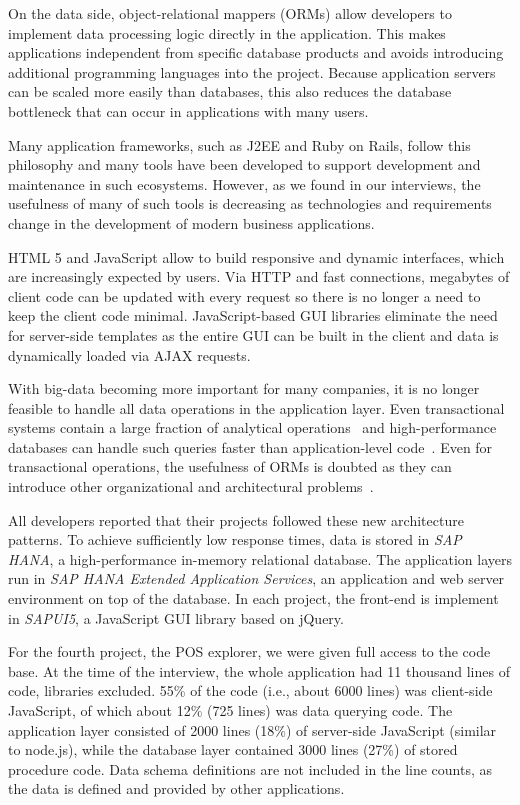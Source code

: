 \documentclass[
      english,
			conference,
      ]{IEEEtran}
\begin{document}
On the data side, object-relational mappers (ORMs) allow developers to implement data processing logic directly in the application.
This makes applications independent from specific database products and avoids introducing additional programming languages into the project.
Because application servers can be scaled more easily than databases, this also reduces the database bottleneck that can occur in applications with many users.

Many application frameworks, such as J2EE and Ruby on Rails, follow this philosophy and many tools have been developed to support development and maintenance in such ecosystems.
However, as we found in our interviews, the usefulness of many of such tools is decreasing as technologies and requirements change in the development of modern business applications.

HTML 5 and JavaScript allow to build responsive and dynamic interfaces, which are increasingly expected by users.
Via HTTP and fast connections, megabytes of client code can be updated with every request so there is no longer a need to keep the client code minimal.
JavaScript-based GUI libraries eliminate the need for server-side templates as the entire GUI can be built in the client and data is dynamically loaded via AJAX requests.

With big-data becoming more important for many companies, it is no longer feasible to handle all data operations in the application layer.
Even transactional systems contain a large fraction of analytical operations~\cite{krueger_case_2010} and high-performance databases can handle such queries faster than application-level code~\cite{plattner_common_2009}.
Even for transactional operations, the usefulness of ORMs is doubted as they can introduce other organizational and architectural problems~\cite{neward_vietnam_2006}.

All developers reported that their projects followed these new architecture patterns.
To achieve sufficiently low response times, data is stored in \emph{SAP HANA}, a high-performance in-memory relational database.
The application layers run in \emph{SAP HANA Extended Application Services}, an application and web server environment on top of the database.
In each project, the front-end is implement in \emph{SAPUI5}, a JavaScript GUI library based on jQuery.

For the fourth project, the POS explorer, we were given full access to the code base.
At the time of the interview, the whole application had 11 thousand lines of code, libraries excluded.
55\% of the code (i.e., about 6000 lines) was client-side JavaScript, of which about 12\% (725 lines) was data querying code.
The application layer consisted of 2000 lines (18\%) of server-side JavaScript (similar to node.js), while the database layer contained 3000 lines (27\%) of stored procedure code.
Data schema definitions are not included in the line counts, as the data is defined and provided by other applications.
\end{document}
